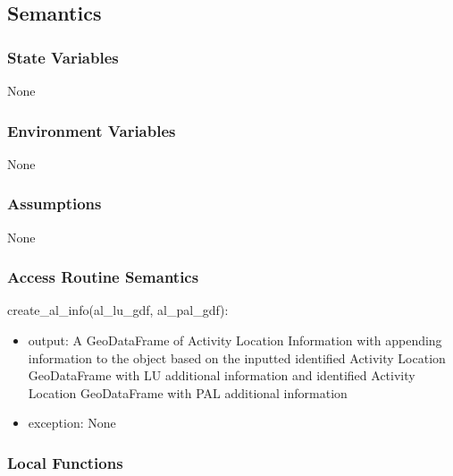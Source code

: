 \documentclass[12pt, titlepage]{article}
\begin{document}
\subsection{Semantics}

\subsubsection{State Variables}

None

\subsubsection{Environment Variables}

None

\subsubsection{Assumptions}

None

\subsubsection{Access Routine Semantics}

create\_al\_info(al\_lu\_gdf, al\_pal\_gdf):
\begin{itemize}
\item output: A GeoDataFrame of Activity Location Information with appending information to the object based on the inputted identified Activity Location GeoDataFrame with LU additional information and identified Activity Location GeoDataFrame with PAL additional information 
\item exception: None
\end{itemize}

\subsubsection{Local Functions}
\end{document}
